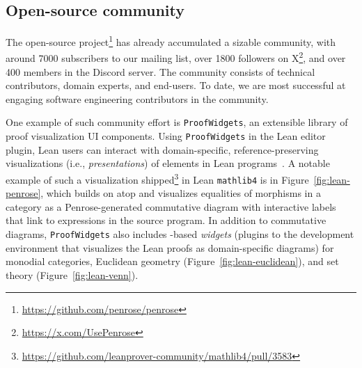 \subsection{Open-source community} 

The \Penrose open-source project\footnote{\url{https://github.com/penrose/penrose}} has already accumulated a sizable community, with around 7000 subscribers to our mailing list, over 1800 followers on X\footnote{\url{https://x.com/UsePenrose}}, and over 400 members in the \Penrose Discord server. The community consists of technical contributors, domain experts, and end-users. To date, we are most successful at engaging software engineering contributors in the community. 

One example of such community effort is \texttt{ProofWidgets}, an extensible library of proof visualization UI components. Using \texttt{ProofWidgets} in the Lean editor plugin, Lean users can interact with domain-specific, reference-preserving visualizations (i.e., \textit{presentations}) of elements in Lean programs~\cite{nawrocki_extensible_2023}. A notable example of such a visualization shipped\footnote{\url{https://github.com/leanprover-community/mathlib4/pull/3583}} in Lean \texttt{mathlib4} is in Figure~\ref{fig:lean-penrose}, which builds on atop \Penrose{} and visualizes equalities of morphisms in a category as a Penrose-generated commutative diagram with interactive labels that link to expressions in the source program. In addition to commutative diagrams, \texttt{ProofWidgets} also includes \Penrose{}-based \emph{widgets} (plugins to the development environment that visualizes the Lean proofs as domain-specific diagrams) for monodial categories, Euclidean geometry (Figure~\ref{fig:lean-euclidean}), and set theory (Figure~\ref{fig:lean-venn}). 





